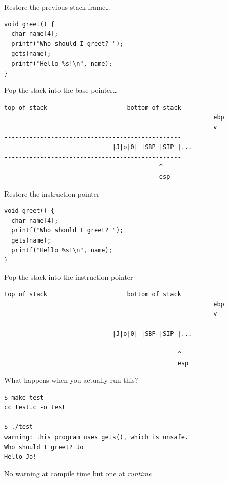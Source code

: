 \documentclass[9pt,aspectratio=169]{beamer}
\begin{document}
\begin{frame}[label={sec:org71d9302},fragile]{Restore the previous stack frame\ldots{}}
 \begin{verbatim}
void greet() {
  char name[4];
  printf("Who should I greet? ");
  gets(name);
  printf("Hello %s!\n", name);
}
\end{verbatim}

Pop the stack into the base pointer\ldots{}

\begin{verbatim}
top of stack                      bottom of stack
                                                          ebp
                                                          v
-------------------------------------------------
                              |J|o|0| |SBP |SIP |...
-------------------------------------------------
                                           ^
                                           esp
\end{verbatim}
\end{frame}

\begin{frame}[label={sec:org82f8b02},fragile]{Restore the instruction pointer}
 \begin{verbatim}
void greet() {
  char name[4];
  printf("Who should I greet? ");
  gets(name);
  printf("Hello %s!\n", name);
}
\end{verbatim}

Pop the stack into the instruction pointer

\begin{verbatim}
top of stack                      bottom of stack
                                                          ebp
                                                          v
-------------------------------------------------
                              |J|o|0| |SBP |SIP |...
-------------------------------------------------
                                                ^
                                                esp
\end{verbatim}
\end{frame}

\begin{frame}[label={sec:orgfad53ba},fragile]{What happens when you actually run this?}
 \begin{verbatim}
$ make test
cc test.c -o test

$ ./test
warning: this program uses gets(), which is unsafe.
Who should I greet? Jo
Hello Jo!
\end{verbatim}

No warning at compile time but one at \emph{runtime}
\end{frame}
\end{document}
